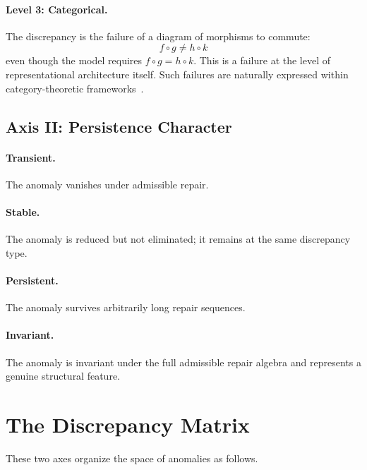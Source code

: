 \documentclass[12pt,oneside]{book}
\theoremstyle{plain}
\theoremstyle{definition}
\theoremstyle{remark}
\newcommand{\1}{\mathbf{1}}
\begin{document}
\paragraph{Level 3: Categorical.}
The discrepancy is the failure of a diagram of morphisms to commute:
\[
f \circ g \neq h \circ k
\]
even though the model requires $f \circ g = h \circ k$. This is a failure at the level of representational architecture itself. Such failures are naturally expressed within category-theoretic frameworks~\cite{maclane1971,awodey2010,riehl2016}.

\subsection{Axis II: Persistence Character}

\paragraph{Transient.} The anomaly vanishes under admissible repair.

\paragraph{Stable.} The anomaly is reduced but not eliminated; it remains at the same discrepancy type.

\paragraph{Persistent.} The anomaly survives arbitrarily long repair sequences.

\paragraph{Invariant.} The anomaly is invariant under the full admissible repair algebra and represents a genuine structural feature.

\section{The Discrepancy Matrix}

These two axes organize the space of anomalies as follows.
\end{document}
